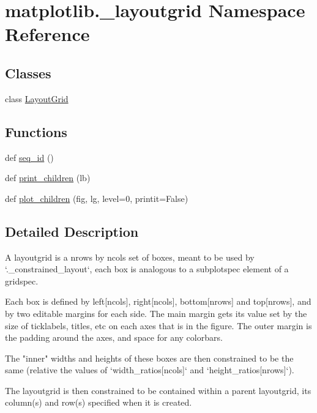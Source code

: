 \hypertarget{namespacematplotlib_1_1__layoutgrid}{}\section{matplotlib.\+\_\+layoutgrid Namespace Reference}
\label{namespacematplotlib_1_1__layoutgrid}
\subsection*{Classes}
\begin{DoxyCompactItemize}
\item 
class \hyperlink{classmatplotlib_1_1__layoutgrid_1_1LayoutGrid}{Layout\+Grid}
\end{DoxyCompactItemize}
\subsection*{Functions}
\begin{DoxyCompactItemize}
\item 
def \hyperlink{namespacematplotlib_1_1__layoutgrid_a16fe697cb96f7405bd76e42425329895}{seq\+\_\+id} ()
\item 
def \hyperlink{namespacematplotlib_1_1__layoutgrid_a3ca761132b41d5e09623ccb54c90fca5}{print\+\_\+children} (lb)
\item 
def \hyperlink{namespacematplotlib_1_1__layoutgrid_acda0f256a21eb2f7345b0ae77d98d11a}{plot\+\_\+children} (fig, lg, level=0, printit=False)
\end{DoxyCompactItemize}


\subsection{Detailed Description}
\begin{DoxyVerb}A layoutgrid is a nrows by ncols set of boxes, meant to be used by
`._constrained_layout`, each box is analogous to a subplotspec element of
a gridspec.

Each box is defined by left[ncols], right[ncols], bottom[nrows] and top[nrows],
and by two editable margins for each side.  The main margin gets its value
set by the size of ticklabels, titles, etc on each axes that is in the figure.
The outer margin is the padding around the axes, and space for any
colorbars.

The "inner" widths and heights of these boxes are then constrained to be the
same (relative the values of `width_ratios[ncols]` and `height_ratios[nrows]`).

The layoutgrid is then constrained to be contained within a parent layoutgrid,
its column(s) and row(s) specified when it is created.
\end{DoxyVerb}
 


